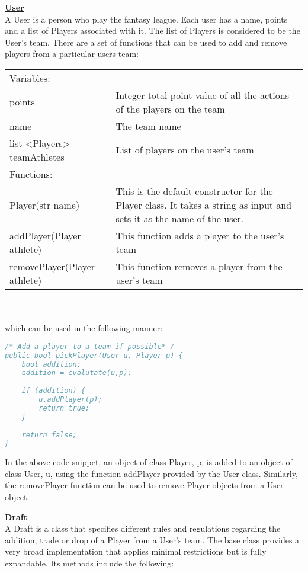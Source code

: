 \documentclass[12pt]{report}
\begin{document}
\begin{doublespace}
\textbf{\underline{User}}
\\
A User is a person who play the fantasy league. Each user has a name, points and a list of Players associated with it. The list of Players is considered to be the User's team. There are a set of functions that can be used to add and remove players from a particular users team:

\begin{tabular}{ l p{11cm} }
Variables: & \\
points & Integer total point value of all the actions of the players on the team \\
name & The team name \\
list <Players> teamAthletes & List of players on the user's team \\
Functions: & \\
Player(str name) & This is the default constructor for the Player class. It takes a string as input and sets it as the name of the user. \\
addPlayer(Player athlete) & This function adds a player to the user's team \\
removePlayer(Player athlete) & This function removes a player from the user's team
\end{tabular}
\\\\
which can be used in the following manner:
\end{doublespace}

\begin{lstlisting}[language=Java,label=some-code,caption=Action]
/* Add a player to a team if possible* /
public bool pickPlayer(User u, Player p) {
	bool addition;
	addition = evalutate(u,p);
	
	if (addition) {
		u.addPlayer(p);
		return true;
	}
	
	return false;
}
\end{lstlisting}

\begin{doublespace}
In the above code snippet, an object of class Player, p, is added to an object of class User, u, using the function addPlayer provided by the User class. Similarly, the removePlayer function can be used to remove Player objects from a User object.

\textbf{\underline{Draft}}
\\
A Draft is a class that specifies different rules and regulations regarding the addition, trade or drop of a Player from a User's team. The base class provides a very broad implementation that applies minimal restrictions but is fully expandable. Its methods include the following:
\end{doublespace}
\end{document}
